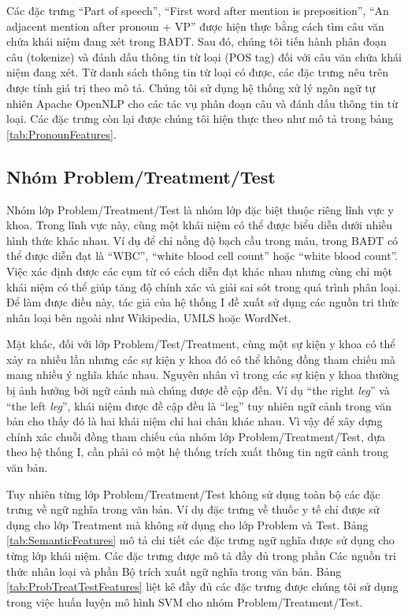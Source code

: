 Các đặc trưng ``Part of speech'', ``First word after mention is preposition'', ``An adjacent mention after pronoun + VP'' được hiện thực bằng cách tìm câu văn chứa khái niệm đang xét trong BAĐT. Sau đó, chúng tôi tiến hành phân đoạn câu (tokenize) và đánh dấu thông tin từ loại (POS tag) đối với câu văn chứa khái niệm đang xét. Từ danh sách thông tin từ loại có được, các đặc trưng nêu trên được tính giá trị theo mô tả. Chúng tôi sử dụng hệ thống xử lý ngôn ngữ tự nhiên Apache OpenNLP cho các tác vụ phân đoạn câu và đánh dấu thông tin từ loại. Các đặc trưng còn lại được chúng tôi hiện thực theo như mô tả trong bảng \ref{tab:PronounFeatures}.

\subsection*{Nhóm Problem/Treatment/Test}
Nhóm lớp Problem/Treatment/Test là nhóm lớp đặc biệt thuộc riêng lĩnh vực y khoa. Trong lĩnh vực này, cùng một khái niệm có thể được biểu diễn dưới nhiều hình thức khác nhau. Ví dụ để chỉ nồng độ bạch cầu trong máu, trong BAĐT có thể được diễn đạt là ``WBC'', ``white blood cell count'' hoặc ``white blood count''. Việc xác định được các cụm từ có cách diễn đạt khác nhau nhưng cùng chỉ một khái niệm có thể giúp tăng độ chính xác và giải sai sót trong quá trình phân loại. Để làm được điều này, tác giả của hệ thống I đề xuất sử dụng các nguồn tri thức nhân loại bên ngoài như Wikipedia, UMLS hoặc WordNet.

Mặt khác, đối với lớp Problem/Test/Treatment, cùng một sự kiện y khoa có thể xảy ra nhiều lần nhưng các sự kiện y khoa đó có thể không đồng tham chiếu mà mang nhiều ý nghĩa khác nhau. Nguyên nhân vì trong các sự kiện y khoa thường bị ảnh hưởng bởi ngữ cảnh mà chúng được đề cập đến. Ví dụ ``the right \textit{leg}'' và ``the left \textit{leg}'', khái niệm được đề cập đều là ``leg'' tuy nhiên ngữ cảnh trong văn bản cho thấy đó là hai khái niệm chỉ hai chân khác nhau. Vì vậy để xây dựng chính xác chuỗi đồng tham chiếu của nhóm lớp Problem/Treatment/Test, dựa theo hệ thống I, cần phải có một hệ thống trích xuất thông tin ngữ cảnh trong văn bản.

Tuy nhiên từng lớp Problem/Treatment/Test không sử dụng toàn bộ các đặc trưng về ngữ nghĩa trong văn bản. Ví dụ đặc trưng về thuốc y tế chỉ được sử dụng cho lớp Treatment mà không sử dụng cho lớp Problem và Test. Bảng \ref{tab:SemanticFeatures} mô tả chi tiết các đặc trưng ngữ nghĩa được sử dụng cho từng lớp khái niệm. Các đặc trưng được mô tả đầy đủ trong phần Các nguồn tri thức nhân loại và phần Bộ trích xuất ngữ nghĩa trong văn bản. Bảng \ref{tab:ProbTreatTestFeatures} liệt kê đầy đủ các đặc trưng được chúng tôi sử dụng trong việc huấn luyện mô hình SVM cho nhóm Problem/Treatment/Test. 

